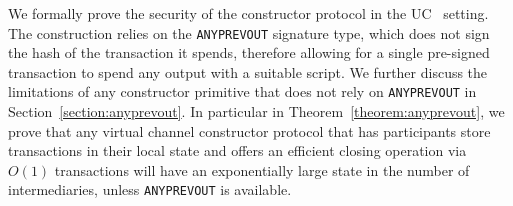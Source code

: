   We formally prove the security of the constructor protocol in the  UC~\cite{uc} setting. The construction relies on the \texttt{ANYPREVOUT}   signature type, which does not sign the hash of the transaction it spends, therefore allowing for a single pre-signed transaction to spend any output
  with a suitable script. We further discuss the limitations of any constructor
  primitive that does not rely on \texttt{ANYPREVOUT} in
  Section~\ref{section:anyprevout}. In particular in Theorem~\ref{theorem:anyprevout},
  we prove that any virtual channel constructor protocol that
  has participants store transactions in their local state
  and offers an efficient closing operation via $O(1)$ transactions
  will have an exponentially large state in the number of intermediaries, unless
  \texttt{ANYPREVOUT} is available. 
